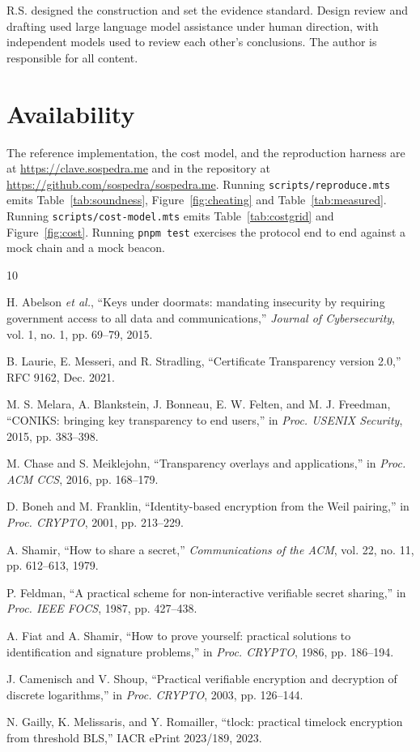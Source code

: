 \documentclass[11pt,a4paper]{article}
\begin{document}
R.S. designed the construction and set the evidence standard. Design review and
drafting used large language model assistance under human direction, with
independent models used to review each other's conclusions. The author is
responsible for all content.

\section*{Availability}

The reference implementation, the cost model, and the reproduction harness are
at \url{https://clave.sospedra.me} and in the repository at
\url{https://github.com/sospedra/sospedra.me}. Running
\texttt{scripts/reproduce.mts} emits Table~\ref{tab:soundness},
Figure~\ref{fig:cheating} and Table~\ref{tab:measured}. Running
\texttt{scripts/cost-model.mts} emits Table~\ref{tab:costgrid} and
Figure~\ref{fig:cost}. Running \texttt{pnpm test} exercises the protocol
end to end against a mock chain and a mock beacon.

\begin{thebibliography}{10}

H. Abelson \emph{et al.}, ``Keys under doormats: mandating insecurity by
requiring government access to all data and communications,''
\emph{Journal of Cybersecurity}, vol. 1, no. 1, pp. 69--79, 2015.

B. Laurie, E. Messeri, and R. Stradling, ``Certificate Transparency version
2.0,'' RFC 9162, Dec. 2021.

M. S. Melara, A. Blankstein, J. Bonneau, E. W. Felten, and M. J. Freedman,
``CONIKS: bringing key transparency to end users,'' in \emph{Proc. USENIX
Security}, 2015, pp. 383--398.

M. Chase and S. Meiklejohn, ``Transparency overlays and applications,'' in
\emph{Proc. ACM CCS}, 2016, pp. 168--179.

D. Boneh and M. Franklin, ``Identity-based encryption from the Weil pairing,''
in \emph{Proc. CRYPTO}, 2001, pp. 213--229.

A. Shamir, ``How to share a secret,'' \emph{Communications of the ACM},
vol. 22, no. 11, pp. 612--613, 1979.

P. Feldman, ``A practical scheme for non-interactive verifiable secret
sharing,'' in \emph{Proc. IEEE FOCS}, 1987, pp. 427--438.

A. Fiat and A. Shamir, ``How to prove yourself: practical solutions to
identification and signature problems,'' in \emph{Proc. CRYPTO}, 1986,
pp. 186--194.

J. Camenisch and V. Shoup, ``Practical verifiable encryption and decryption of
discrete logarithms,'' in \emph{Proc. CRYPTO}, 2003, pp. 126--144.

N. Gailly, K. Melissaris, and Y. Romailler, ``tlock: practical timelock
encryption from threshold BLS,'' IACR ePrint 2023/189, 2023.

\end{thebibliography}
\end{document}
